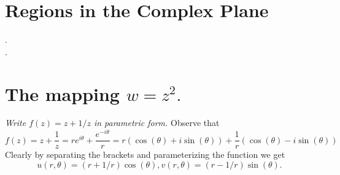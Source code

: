 \documentclass[letter]{article}
\newenvironment{menumerate}{%
  \edef\backupindent{\the\parindent}%
  \enumerate%
  \setlength{\parindent}{\backupindent}%
}{\endenumerate}
\begin{document}
\section{Regions in the Complex Plane}
\begin{menumerate}
	\setcounter{enumi}{3}
	\item .	\\[5in]
	.	\\[5in]
\end{menumerate}
\setcounter{section}{13}
\section{The mapping $w = z^2.$}
\begin{menumerate}
	\setcounter{enumi}{3}
	\item\emph{ Write $f(z) = z + 1/z$ in parametric form.} Observe that
	\begin{equation}
		f(z) = z + \frac{1}{z} = re^{i\theta} + \frac{e^{-i\theta}}{r} = 
		r(\cos(\theta) + i\sin(\theta)) + \frac{1}{r}(\cos(\theta) -i\sin(\theta))
	\end{equation}
	Clearly by separating the brackets and parameterizing the function we get
	\begin{equation}
		u(r, \theta) = (r + 1/r)\cos(\theta), v(r, \theta) = (r - 1/r)\sin(\theta).
	\end{equation}
\end{menumerate}
\end{document}
